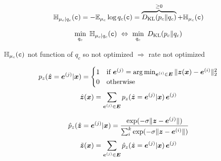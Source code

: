 \documentclass[smaller]{beamer}
\renewcommand{\rvx}{\mathtt{x}}
\renewcommand{\rvc}{\mathtt{c}}
\newcommand{\pc}{p_c}
\newcommand{\qc}{q_c}
\newcommand{\muc}{\mu_c}
\newcommand{\Hc}{\sH_{\muc}}
\newcommand{\cHc}{\sH_{\muc|\qc}}
\newcommand{\gDp}{\gD_\phi}
\newcommand{\vzh}{\hat{\vz}}
\newcommand{\vzt}{\tilde{\vz}}
\begin{document}
\begin{frame}[t]
\begin{tikzpicture}
\end{tikzpicture}

\vskip 0.8cm


\[ \cHc(\rvc) = - \E_{\muc} \log q_c(\rvc) = \overbrace{\KL(\pc \Vert \qc)}^{\geq 0} + \Hc(\rvc)\]

\[\min_{q_c} \ \cHc(\rvc) \ \Leftrightarrow \ \min_{q_c} \ \KL(\pc \Vert \qc) \]


\center 
\alert{$\Hc(\rvc)$ not function of $q_c$ so not optimized $\Rightarrow$ rate not optimized}




\end{frame}


\begin{frame}[t]


\vskip 0.8cm


\vskip 0.3cm

{\scriptsize
{}
\[
p_z(\vzh = \ve^{(j)} \vert \vx) = \begin{cases}
1 & \text{if} \ \ve^{(j)} = \argmin_{\ve^{(i)} \in \mE} \Vert \vz(\vx) - \ve^{(i)}\Vert_2^2 \\
0 & \text{otherwise}
\end{cases}
\]
\[\vzh(\vx) = \sum_{\ve^{(j)} \in \mE} p_z(\vzh = \ve^{(j)} | \vx) \, \ve^{(j)}\]

\[\hat{p}_z(\vzh = \ve^{(j)} | \vx) = \frac{\exp(-\sigma \Vert \vz - \ve^{(j)} \Vert)}{\sum_i^k \exp(-\sigma \Vert \vz - \ve^{(i)} \Vert)}
\]
\[\vzt(\vx) = \sum_{\ve^{(j)} \in \mE} \hat{p}_z(\vzh = \ve^{(j)} | \vx) \, \ve^{(j)}\]
}



\end{frame}


\end{document}
